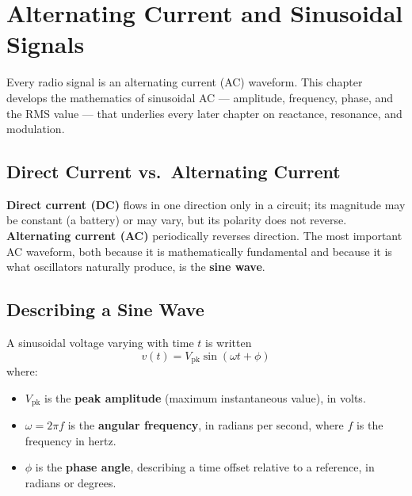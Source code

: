 \chapter{Alternating Current and Sinusoidal Signals}
\label{ch:ac-theory}

Every radio signal is an alternating current (AC) waveform. This chapter
develops the mathematics of sinusoidal AC --- amplitude, frequency,
phase, and the RMS value --- that underlies every later chapter on
reactance, resonance, and modulation.

\section{Direct Current vs.\ Alternating Current}

\textbf{Direct current (DC)} flows in one direction only in a circuit;
its magnitude may be constant (a battery) or may vary, but its polarity
does not reverse. \textbf{Alternating current (AC)} periodically reverses
direction. The most important AC waveform, both because it is
mathematically fundamental and because it is what oscillators naturally
produce, is the \textbf{sine wave}.

\section{Describing a Sine Wave}

A sinusoidal voltage varying with time $t$ is written
\[
\boxed{v(t) = V_{\text{pk}}\sin(\omega t + \phi)}
\]
where:
\begin{itemize}
\item $V_{\text{pk}}$ is the \textbf{peak amplitude} (maximum
instantaneous value), in volts.
\item $\omega = 2\pi f$ is the \textbf{angular frequency}, in radians per
second, where $f$ is the frequency in hertz.
\item $\phi$ is the \textbf{phase angle}, describing a time offset
relative to a reference, in radians or degrees.
\end{itemize}

\begin{center}
\end{center}

